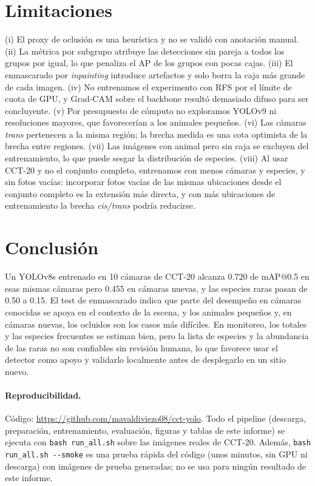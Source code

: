 \documentclass{article}
\begin{document}
\section{Limitaciones}
(i) El proxy de oclusión es una heurística y no se validó con anotación manual.
(ii) La métrica por subgrupo atribuye las detecciones sin pareja a todos los grupos por igual, lo que
penaliza el AP de los grupos con pocas cajas. (iii) El enmascarado por \emph{inpainting} introduce
artefactos y solo borra la caja más grande de cada imagen. (iv) No entrenamos el experimento con RFS
por el límite de cuota de GPU, y Grad-CAM sobre el backbone resultó demasiado
difuso para ser concluyente. (v) Por presupuesto de cómputo no exploramos YOLOv9 ni resoluciones mayores, que
favorecerían a los animales pequeños. (vi) Las cámaras \emph{trans} pertenecen a la misma región; la
brecha medida es una cota optimista de la brecha entre regiones. (vii) Las imágenes con animal pero
sin caja se excluyen del entrenamiento, lo que puede sesgar la distribución de especies.
(viii) Al usar CCT-20 y no el conjunto completo, entrenamos con menos cámaras y especies, y sin fotos
vacías: incorporar fotos vacías de las mismas ubicaciones desde el conjunto completo es la extensión
más directa, y con más ubicaciones de entrenamiento la brecha \emph{cis/trans} podría reducirse.

\section{Conclusión}
Un YOLOv8s entrenado en 10 cámaras de CCT-20 alcanza 0.720 de mAP@0.5 en esas mismas cámaras pero
0.455 en cámaras nuevas, y las especies raras pasan de 0.50 a 0.15. El test de enmascarado indica que
parte del desempeño en cámaras conocidas se apoya en el contexto de la escena, y los animales pequeños
y, en cámaras nuevas, los ocluidos son los casos más difíciles. En monitoreo, los totales y las
especies frecuentes se estiman bien, pero la lista de especies y la abundancia de las raras no son
confiables sin revisión humana, lo que favorece usar el detector como apoyo y validarlo localmente antes
de desplegarlo en un sitio nuevo.

\paragraph{Reproducibilidad.} Código: \url{https://github.com/mavaldiviezo08/cct-yolo}. Todo el pipeline (descarga,
preparación, entrenamiento, evaluación, figuras y tablas de este informe) se ejecuta con
\texttt{bash run\_all.sh} sobre las imágenes reales de CCT-20. Además, \texttt{bash run\_all.sh -{}-smoke} es una prueba rápida del código (unos minutos, sin GPU ni descarga) con imágenes de prueba generadas; no se usa para ningún resultado de este informe.

{\small\setlength{\bibsep}{2pt}

}
\end{document}
